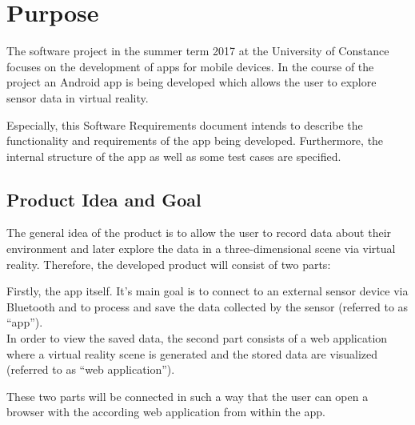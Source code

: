 \section{Purpose}

The software project in the summer term 2017 at the University of Constance focuses on the development of apps for mobile devices. In the course of the project an Android app is being developed which allows the user to explore sensor data in virtual reality.

Especially, this Software Requirements document intends to describe the functionality and requirements of the app being developed. Furthermore, the internal structure of the app as well as some test cases are specified.

\subsection{Product Idea and Goal}

The general idea of the product is to allow the user to record data about their environment and later explore the data in a three-dimensional scene via virtual reality. Therefore, the developed product will consist of two parts:

Firstly, the app itself. It's main goal is to connect to an external sensor device via Bluetooth and to process and save the data collected by the sensor (referred to as ``app''). \\
In order to view the saved data, the second part consists of a web application where a virtual reality scene is generated and the stored data are visualized (referred to as ``web application'').

These two parts will be connected in such a way that the user can open a browser with the according web application from within the app.





